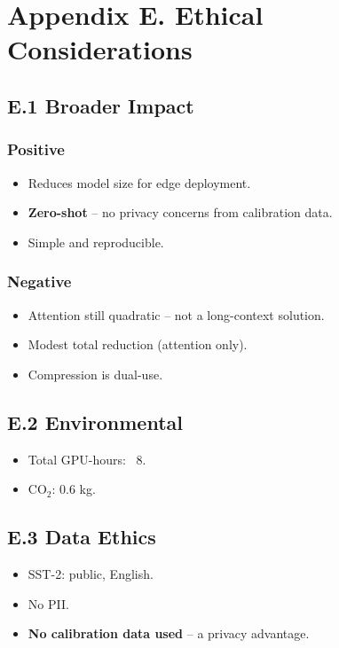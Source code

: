 \section{Appendix E. Ethical Considerations}

\subsection{E.1 Broader Impact}

\subsubsection{Positive}
\begin{itemize}
\item Reduces model size for edge deployment.
\item \textbf{Zero-shot} -- no privacy concerns from calibration data.
\item Simple and reproducible.

\end{itemize}
\subsubsection{Negative}
\begin{itemize}
\item Attention still quadratic -- not a long-context solution.
\item Modest total reduction (attention only).
\item Compression is dual-use.

\end{itemize}
\subsection{E.2 Environmental}

\begin{itemize}
\item Total GPU-hours: ~8.
\item CO$_2$: 0.6 kg.

\end{itemize}
\subsection{E.3 Data Ethics}

\begin{itemize}
\item SST-2: public, English.
\item No PII.
\item \textbf{No calibration data used} -- a privacy advantage.

\end{itemize}
